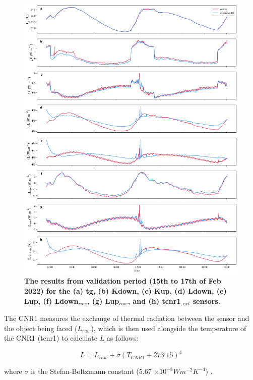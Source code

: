 \documentclass[final,3p,times,authoryear]{elsarticle}
\begin{document}
\begin{figure}
\centering
\includegraphics[trim={0 0 0 0},clip,scale=1.0]{pict020.png}
\caption{\bf The results from validation period (15th to 17th of Feb 2022) for the (a) \gls{tg}, (b) \gls{Kdown}, (c) \gls{Kup}, (d) \gls{Ldown}, (e) \gls{Lup}, (f) \gls{Ldown}$_{raw}$, (g) \gls{Lup}$_{raw}$, and (h) \gls{tcnr1}$_{,ext}$ sensors.}
 \label{fig:7.5}
\end{figure}

The CNR1 measures the exchange of thermal radiation between the sensor and the object being faced ($L_{raw}$), which is then used alongside the temperature of the CNR1 (\gls{tcnr1}) to calculate $L$ as follows:

\begin{equation}
L = L_{raw} + \sigma (T_{CNR1} + 273.15)^{4}
\label{eq:7.3} 
\end{equation}

where $\sigma$ is the Stefan-Boltzmann constant (5.67 $\times 10^{-8} Wm^{-2}K^{-4}$) \citep{CampbellScientific2011}.
\end{document}
